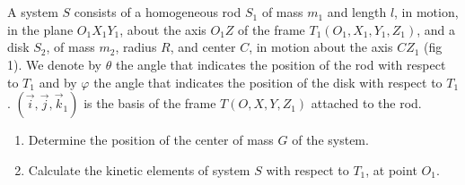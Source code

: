 \documentclass[12pt]{article}
\begin{document}
\section{}

A system $S$ consists of a homogeneous rod $S_1$ of mass $m_1$ and length $l$, in motion, in the plane $O_1X_1Y_1$, about the axis $O_1Z$ of the frame $T_1(O_1, X_1, Y_1, Z_1)$, and a disk $S_2$, of mass $m_2$, radius $R$, and center $C$, in motion about the axis $CZ_1$ (fig 1). We denote by $\theta$ the angle that indicates the position of the rod with respect to $T_1$ and by $\varphi$ the angle that indicates the position of the disk with respect to $T_1$. $(\vec{i}, \vec{j}, \vec{k}_1)$ is the basis of the frame $T(O, X, Y, Z_1)$ attached to the rod.

\begin{enumerate}
    \item Determine the position of the center of mass $G$ of the system.
    \item Calculate the kinetic elements of system $S$ with respect to $T_1$, at point $O_1$.
\end{enumerate}
\end{document}
